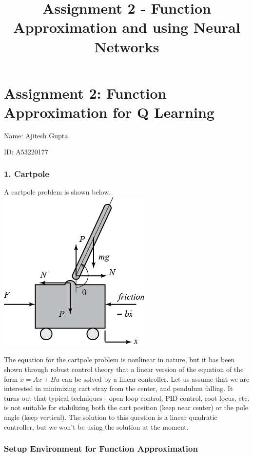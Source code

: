 \documentclass[11pt]{article}
\title{Assignment 2 - Function Approximation and using Neural Networks}
\makeatletter
\def\maxwidth{\ifdim\Gin@nat@width>\linewidth\linewidth
    \else\Gin@nat@width\fi}
\let\Oldincludegraphics\includegraphics
\renewcommand{\includegraphics}[1]{\Oldincludegraphics[width=.8\maxwidth]{#1}}
\makeatother
\begin{document}
    
    
    \maketitle
    
    

    
    \section{Assignment 2: Function Approximation for Q
Learning}\label{assignment-2-function-approximation-for-q-learning}

Name: Ajitesh Gupta

ID: A53220177

    \subsubsection{1. Cartpole}\label{cartpole}

A cartpole problem is shown below. \includegraphics{pendulum2.png}

The equation for the cartpole problem is nonlinear in nature, but it has
been shown through robust control theory that a linear version of the
equation of the form \(\dot{x} = Ax+Bu\) can be solved by a linear
controller. Let us assume that we are interested in minimizing cart
stray from the center, and pendulum falling. It turns out that typical
techniques - open loop control, PID control, root locus, etc. is not
suitable for stabilizing both the cart position (keep near center) or
the pole angle (keep vertical). The solution to this question is a
linear quadratic controller, but we won't be using the solution at the
moment.

    \subsubsection{Setup Environment for Function
Approximation}\label{setup-environment-for-function-approximation}
\end{document}
